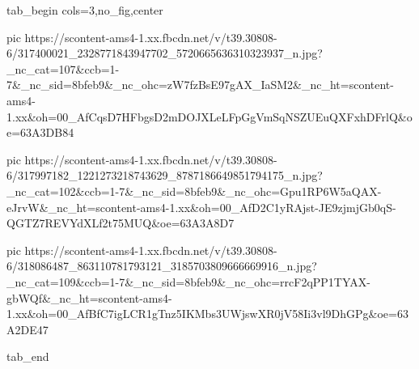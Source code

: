  
 
 
 
 


\ifcmt
  tab_begin cols=3,no_fig,center

     pic https://scontent-ams4-1.xx.fbcdn.net/v/t39.30808-6/317400021_2328771843947702_5720665636310323937_n.jpg?_nc_cat=107&ccb=1-7&_nc_sid=8bfeb9&_nc_ohc=zW7fzBsE97gAX_IaSM2&_nc_ht=scontent-ams4-1.xx&oh=00_AfCqsD7HFbgsD2mDOJXLeLFpGgVmSqNSZUEuQXFxhDFrlQ&oe=63A3DB84

     pic https://scontent-ams4-1.xx.fbcdn.net/v/t39.30808-6/317997182_1221273218743629_8787186649851794175_n.jpg?_nc_cat=102&ccb=1-7&_nc_sid=8bfeb9&_nc_ohc=Gpu1RP6W5aQAX-eJrvW&_nc_ht=scontent-ams4-1.xx&oh=00_AfD2C1yRAjst-JE9zjmjGb0qS-QGTZ7REVYdXLf2t75MUQ&oe=63A3A8D7

     pic https://scontent-ams4-1.xx.fbcdn.net/v/t39.30808-6/318086487_863110781793121_3185703809666669916_n.jpg?_nc_cat=109&ccb=1-7&_nc_sid=8bfeb9&_nc_ohc=rrcF2qPP1TYAX-gbWQf&_nc_ht=scontent-ams4-1.xx&oh=00_AfBfC7igLCR1gTnz5IKMbs3UWjswXR0jV58Ii3vl9DhGPg&oe=63A2DE47

  tab_end
\fi
